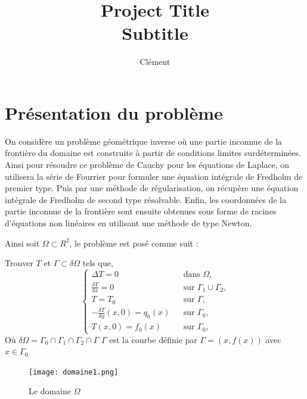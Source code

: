 \documentclass{article}
\title{%
  Project Title \\
  \large Subtitle}
\author{Clément}
\begin{document}

\sffamily
\fancyhf{}
\fancyhead[R]{}
\fancyfoot[R]{ \bf\thepage\ \rm }%
\newpage
\tableofcontents
\newpage


\section{Présentation du problème}


On considère un problème géométrique inverse où une partie inconnue de la frontière du domaine est construite à partir de conditions limites surdéterminées. Ainsi pour résoudre ce problème de Cauchy pour les équations de Laplace, on utilisera la série de Fourrier pour formuler une équation intégrale de Fredholm de premier type. Puis par une méthode de régularisation, on récupère une équation intégrale de Fredholm de second type résolvable. Enfin, les coordonnées de la partie inconnue de la frontière sont ensuite obtenues sous forme de racines d’équations non linéaires en utilisant une méthode de type Newton. 

Ainsi soit $\Omega \subset R^2$, le problème est posé comme suit : 

            Trouver $T$ et $\Gamma \subset \delta \Omega$ tels que,
\begin{equation}
  \label{eq/pb1}
  \left\{
    \begin{array}{rcl}
      \Delta T = 0 && \textrm{dans $\Omega$,}\\
      \frac{\delta T}{\delta x} = 0 && \textrm{sur $\Gamma_1 \cup \Gamma_2$,}\\
      T = T_0 && \textrm{sur $\Gamma$,}\\
      -\frac{\delta T}{\delta y}(x, 0) = q_0(x) && \textrm{sur $\Gamma_0$,}\\
      T(x, 0) = f_0(x) && \textrm{sur $\Gamma_0$,}
    \end{array}
  \right.
  \tag{P1}
\end{equation}
Où $\delta \Omega = \Gamma_0 \cap \Gamma_1 \cap \Gamma_2 \cap \Gamma$
$\Gamma$ est la courbe définie par $\Gamma = (x, f(x))$ avec $x \in \Gamma_0$

\begin{figure}[h]
  \centering
  \texttt{[image: domaine1.png]}
  \label{fig/domaine}
  \caption{Le domaine $\Omega$}
\end{figure}

\vspace{0.5cm}
\end{document}
